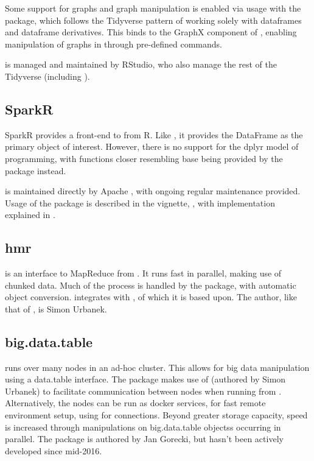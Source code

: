 Some support for graphs and graph manipulation is enabled via usage with
the  package, which follows the Tidyverse pattern of
working solely with dataframes and dataframe derivatives\cite{kuo18}.
This binds to the GraphX component of , enabling manipulation of
graphs in  through pre-defined commands.

 is managed and maintained by RStudio, who also manage the rest
of the Tidyverse (including ).

\subsection{SparkR}\label{subsec:sparkr}

SparkR provides a front-end to  from
R\cite{venkataraman20:_spark}. Like , it provides the DataFrame
as the primary object of interest. However, there is no support for the
dplyr model of programming, with functions closer resembling base \R
being provided by the package instead.

 is maintained directly by Apache , with ongoing regular
maintenance provided. Usage of the package is described in the vignette,
\textcite{venktaraman19:spark-pract-guide}, with implementation
explained in \cite{venkataraman2016sparkr}.

\subsection{hmr}\label{subsec:hmr}

 is an interface to MapReduce from \R\cite{urbanek20}. It runs
fast in parallel, making use of chunked data. Much of the process is handled by the
package, with automatic \R object conversion.  integrates with
, of which it is based upon. The author, like that of , is
Simon Urbanek.

\subsection{big.data.table}\label{subsec:big.data.table}

 runs  over many nodes in an ad-hoc
cluster\cite{gorecki16}. This allows for big data manipulation using a
data.table interface. The package makes use of  (authored by Simon
Urbanek) to facilitate communication between nodes when running from \R.
Alternatively, the nodes can be run as docker services, for fast remote
environment setup, using  for connections. Beyond greater
storage capacity, speed is increased through manipulations on
big.data.table objectss occurring in parallel. The package is authored by Jan
Gorecki, but hasn't been actively developed since mid-2016.
